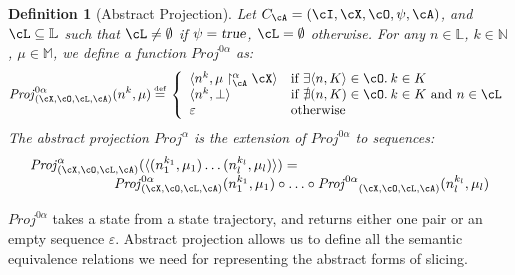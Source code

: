 \documentclass[prodmode,acmtocl]{acmsmall}
\newcommand{\caX}{\cX}
\def\memory{\ensuremath{\mu}\xspace}
\def\memories{\ensuremath{\mathbb{M}}\xspace}
\def\lnums{\ensuremath{\mathbb{L}}\xspace}
\def\crit{\ensuremath{C}\xspace}
\newcommand{\ABSMEM}[3]{#1 \upharpoonright^\alpha_{#3} #2}
\def\Proj{\ensuremath{\mathit{Proj}}\xspace}
\def\defi{\mbox{\raisebox{0ex}[1ex][1ex]{$\stackrel{\mbox{\tiny
def}}{\; =\;}$}}}
\newcommand{\true}{\mbox{\sl true}}
\def\tuple#1{\langle #1 \rangle}
\newcommand{\0}{\mbox{\bf 0}}
\newtheorem{mydefinition}[theorem]{Definition}
\def\NATURALS{\mathbb{N}}
\begin{document}
\begin{mydefinition}[Abstract Projection]
  \label{def:ProjA}
  Let $\crit_\cA=(\cI,\caX,\cO,\psi,\cA)$, and $\cL\subseteq\lnums$
  such that $\cL\neq\emptyset$ if $\psi=\true$, $\cL=\emptyset$
  otherwise. For any $n \in \lnums$, $k \in \NATURALS$, $\memory \in
  \memories$, we define a function $\Proj^{0\alpha}$ as:
  \[ \Proj^{0\alpha}_{(\caX, \cO, \cL,
    \cA)}(n^k, \memory) \defi \left\{
  \begin{array}{l l}
    \tuple{n^k, \ABSMEM{\memory}{\caX}{\cA}} & \mbox{if }
      \exists\tuple{n,K}\in \cO.\:k \in K \\ \tuple{n^k,\bot}
      & \mbox{if }
      \nexists(n,K) \in \cO.\:k \in K\mbox{ and }n\in \cL \\
    \varepsilon &
    \mbox{otherwise}
  \end{array}
  \right.
  \]
  The abstract projection $\Proj^{\alpha}$ is the extension of
  $\Proj^{0\alpha}$ to sequences:
  \[ \begin{array}{l}
    \Proj_{(\caX, \cO, \cL, \cA)}^{\alpha} (\tuple{(n_1^{k_1},\memory_1) \ldots 
    (n_l^{k_l}, \memory_l)})  =\\
    \qquad\qquad\qquad\Proj^{0\alpha}_{(\caX, \cO, \cL, \cA)}(n_1^{k_1},
    \memory_1) \circ \ldots \circ {\Proj^{0\alpha}}_{(\caX, \cO, \cL,
        \cA)}(n_l^{k_l}, \memory_l)
  \end{array}
  \]
\end{mydefinition}

\noindent
$\Proj^{0\alpha}$ takes a state from a state trajectory, and returns
either one pair or an empty sequence $\varepsilon$.  Abstract
projection allows us to define all the semantic equivalence relations
we need for representing the abstract forms of slicing.
\end{document}
